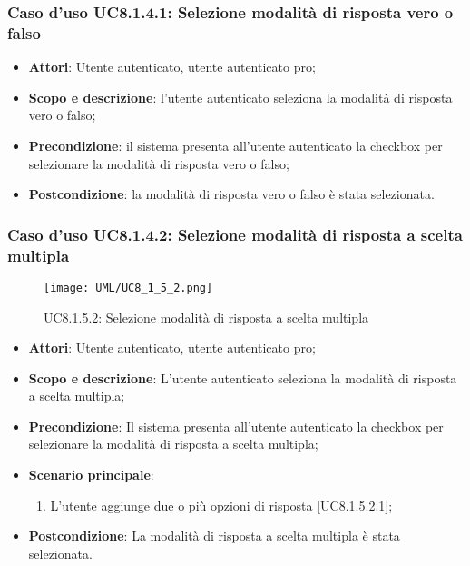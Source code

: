 	\subsubsection{Caso d'uso UC8.1.4.1: Selezione modalità di risposta vero o falso}
	\begin{itemize}
		\item
			\textbf{Attori}: Utente autenticato, utente autenticato pro;
		\item
			\textbf{Scopo e descrizione}: l'utente autenticato seleziona la modalità di risposta vero o falso;
		\item		
			\textbf{Precondizione}: il sistema presenta all'utente autenticato la checkbox per selezionare la modalità di risposta vero o falso;
		\item
			\textbf{Postcondizione}: la modalità di risposta vero o falso è stata selezionata.
	\end{itemize}
	\subsubsection{Caso d'uso UC8.1.4.2: Selezione modalità di risposta a scelta multipla}
	\label{UC8.1.5.2}
	\begin{figure}[h]
		\centering
			\texttt{[image: UML/UC8\_1\_5\_2.png]}
		\caption{UC8.1.5.2: Selezione modalità di risposta a scelta multipla}
	\end{figure}
	\FloatBarrier	
	\begin{itemize}
		\item
			\textbf{Attori}: Utente autenticato, utente autenticato pro;
		\item
			\textbf{Scopo e descrizione}: L'utente autenticato seleziona la modalità di risposta a scelta multipla;
		\item		
			\textbf{Precondizione}: Il sistema presenta all'utente autenticato la checkbox per selezionare la modalità di risposta a scelta multipla;
		\item
			\textbf{Scenario principale}:
				\begin{enumerate}
					\item 	
						L'utente aggiunge due o più opzioni di risposta [UC8.1.5.2.1];	
				\end{enumerate}
		\item
			\textbf{Postcondizione}: La modalità di risposta a scelta multipla è stata selezionata.
	\end{itemize}
